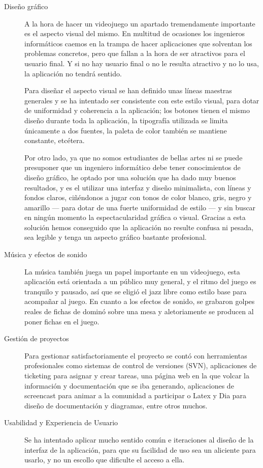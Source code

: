 \begin{description}
    \item[Diseño gráfico] A la hora de hacer un videojuego un apartado tremendamente importante es el aspecto visual del mismo.
        En multitud de ocasiones los ingenieros informáticos caemos en la trampa de hacer aplicaciones que solventan
        los problemas concretos, pero que fallan a la hora de ser atractivos para el usuario final. Y si no hay usuario
        final o no le resulta atractivo y no lo usa, la aplicación no tendrá sentido. 

        Para diseñar el aspecto visual se han definido unas líneas maestras generales y se ha intentado ser consistente
        con este estilo visual, para dotar de uniformidad y coherencia a la aplicación; los botones tienen el mismo diseño
        durante toda la aplicación, la tipografía utilizada se limita únicamente a dos fuentes, la paleta de color
        también se mantiene constante, etcétera. 

        Por otro lado, ya que no somos estudiantes de bellas artes ni se puede presuponer que un ingeniero informático
        debe tener conocimientos de diseño gráfico, he optado por una solución que ha dado muy buenos resultados, y es
        el utilizar una interfaz y diseño minimalista, con líneas y fondos claros, ciñéndonos a jugar con tonos de color
        blanco, gris, negro y amarillo --- para dotar de una fuerte uniformidad de estilo --- y sin buscar en ningún
        momento la espectacularidad gráfica o visual. Gracias a esta solución hemos conseguido que la aplicación no
        resulte confusa ni pesada, sea legible y tenga un aspecto gráfico bastante profesional.

\item [Música y efectos de sonido] La música también juega un papel importante en un videojuego, esta aplicación está orientada a un
        público muy general, y el ritmo del juego es tranquilo y pausado, así que se eligió el jazz libre como estilo base
        para acompañar al juego. En cuanto a los efectos de sonido, se grabaron golpes reales de fichas de dominó sobre una mesa y aletoriamente se producen al poner fichas en el juego.
        
    \item[Gestión de proyectos] Para gestionar satisfactoriamente el proyecto se contó con herramientas profesionales
        como sistemas de control de versiones (SVN), aplicaciones de ticketing para asignar y crear tareas, una página
        web en la que volcar la información y documentación que se iba generando, aplicaciones de screencast para
        animar a la comunidad a participar o Latex y Dia para diseño de documentación y diagramas, entre otros muchos.

    \item[Usabilidad y Experiencia de Usuario] Se ha intentado aplicar mucho sentido común e iteraciones al diseño de la
        interfaz de la aplicación, para que su facilidad de uso sea un aliciente para usarlo, y no un escollo que
        dificulte el acceso a ella.

\end{description}

